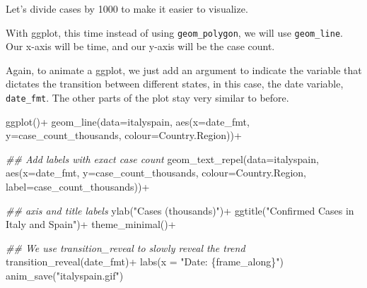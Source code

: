 \documentclass[
  letterpaper,
  DIV=11,
  numbers=noendperiod]{scrreprt}
\newenvironment{Shaded}{\begin{snugshade}}{\end{snugshade}}
\newcommand{\AttributeTok}[1]{\textcolor[rgb]{0.40,0.45,0.13}{#1}}
\newcommand{\DecValTok}[1]{\textcolor[rgb]{0.68,0.00,0.00}{#1}}
\newcommand{\DocumentationTok}[1]{\textcolor[rgb]{0.37,0.37,0.37}{\textit{#1}}}
\newcommand{\FunctionTok}[1]{\textcolor[rgb]{0.28,0.35,0.67}{#1}}
\newcommand{\NormalTok}[1]{\textcolor[rgb]{0.00,0.23,0.31}{#1}}
\newcommand{\OtherTok}[1]{\textcolor[rgb]{0.00,0.23,0.31}{#1}}
\newcommand{\SpecialCharTok}[1]{\textcolor[rgb]{0.37,0.37,0.37}{#1}}
\newcommand{\StringTok}[1]{\textcolor[rgb]{0.13,0.47,0.30}{#1}}
\begin{document}
Let's divide cases by 1000 to make it easier to visualize.

\begin{Shaded}
\end{Shaded}

With ggplot, this time instead of using \texttt{geom\_polygon}, we will
use \texttt{geom\_line}. Our x-axis will be time, and our y-axis will be
the case count.

Again, to animate a ggplot, we just add an argument to indicate the
variable that dictates the transition between different states, in this
case, the date variable, \texttt{date\_fmt}. The other parts of the plot
stay very similar to before.

\begin{Shaded}
\begin{Highlighting}[]
\FunctionTok{ggplot}\NormalTok{()}\SpecialCharTok{+}
  \FunctionTok{geom\_line}\NormalTok{(}\AttributeTok{data=}\NormalTok{italyspain, }\FunctionTok{aes}\NormalTok{(}\AttributeTok{x=}\NormalTok{date\_fmt, }\AttributeTok{y=}\NormalTok{case\_count\_thousands, }
                                 \AttributeTok{colour=}\NormalTok{Country.Region))}\SpecialCharTok{+}
  
  \DocumentationTok{\#\# Add labels with exact case count}
  \FunctionTok{geom\_text\_repel}\NormalTok{(}\AttributeTok{data=}\NormalTok{italyspain, }\FunctionTok{aes}\NormalTok{(}\AttributeTok{x=}\NormalTok{date\_fmt,  }
                                       \AttributeTok{y=}\NormalTok{case\_count\_thousands,}
                                       \AttributeTok{colour=}\NormalTok{Country.Region,}
                                 \AttributeTok{label=}\NormalTok{case\_count\_thousands))}\SpecialCharTok{+}
 
  \DocumentationTok{\#\# axis and title labels}
  \FunctionTok{ylab}\NormalTok{(}\StringTok{"Cases (thousands)"}\NormalTok{)}\SpecialCharTok{+}
  \FunctionTok{ggtitle}\NormalTok{(}\StringTok{"Confirmed Cases in Italy and Spain"}\NormalTok{)}\SpecialCharTok{+}
  \FunctionTok{theme\_minimal}\NormalTok{()}\SpecialCharTok{+}
  
  \DocumentationTok{\#\# We use transition\_reveal to slowly reveal the trend}
  \FunctionTok{transition\_reveal}\NormalTok{(date\_fmt)}\SpecialCharTok{+}
  \FunctionTok{labs}\NormalTok{(}\AttributeTok{x =} \StringTok{"Date: \{frame\_along\}"}\NormalTok{)}
\FunctionTok{anim\_save}\NormalTok{(}\StringTok{"italyspain.gif"}\NormalTok{)}
\end{Highlighting}
\end{Shaded}
\end{document}
